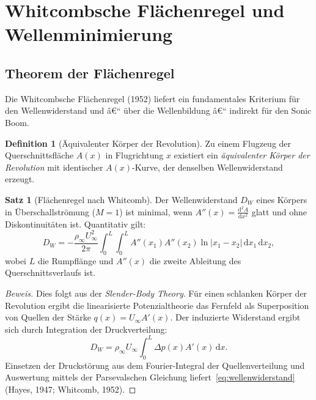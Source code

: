 ﻿\documentclass[12pt,a4paper]{article}
\theoremstyle{definition}
\newtheorem{definition}{Definition}[section]
\newtheorem{satz}{Satz}[section]
\theoremstyle{remark}
\newenvironment{beweis}{\begin{proof}[Beweis]}{\end{proof}}
\newcommand{\dd}{\,\mathrm{d}}
\begin{document}
\section{Whitcombsche Flächenregel und Wellenminimierung}
\label{sec:flaechenregel}

\subsection{Theorem der Flächenregel}

Die Whitcombsche Flächenregel (1952) liefert ein fundamentales Kriterium für den
Wellenwiderstand und â€“ über die Wellenbildung â€“ indirekt für den Sonic Boom.

\begin{definition}[Äquivalenter Körper der Revolution]
  Zu einem Flugzeug der Querschnittsfläche $A(x)$ in Flugrichtung $x$ existiert ein
  \emph{äquivalenter Körper der Revolution} mit identischer $A(x)$-Kurve, der denselben
  Wellenwiderstand erzeugt.
\end{definition}

\begin{satz}[Flächenregel nach Whitcomb]
  \label{satz:flaechenregel}
  Der Wellenwiderstand $D_W$ eines Körpers in Überschallströmung ($M = 1$) ist minimal,
  wenn $A''(x) = \tfrac{\mathrm{d}^2 A}{\mathrm{d}x^2}$ glatt und ohne Diskontinuitäten ist.
  Quantitativ gilt:
  \begin{equation}
    D_W = -\frac{\rho_\infty U_\infty^2}{2\pi} \int_0^L \int_0^L A''(x_1) A''(x_2)
             \ln|x_1 - x_2| \dd x_1 \dd x_2,
    \label{eq:wellenwiderstand}
  \end{equation}
  wobei $L$ die Rumpflänge und $A''(x)$ die zweite Ableitung des Querschnittsverlaufs ist.
\end{satz}

\begin{beweis}
  Dies folgt aus der \emph{Slender-Body Theory}. Für einen schlanken Körper der Revolution
  ergibt die linearisierte Potenzialtheorie das Fernfeld als Superposition von Quellen der
  Stärke $q(x) = U_\infty A'(x)$. Der induzierte Widerstand ergibt sich durch Integration
  der Druckverteilung:
  \begin{equation}
    D_W = \rho_\infty U_\infty \int_0^L \Delta p(x) A'(x) \dd x.
  \end{equation}
  Einsetzen der Druckstörung aus dem Fourier-Integral der Quellenverteilung und Auswertung
  mittels der Parsevalschen Gleichung liefert~\eqref{eq:wellenwiderstand} (Hayes, 1947;
  Whitcomb, 1952). \qedhere
\end{beweis}
\end{document}
